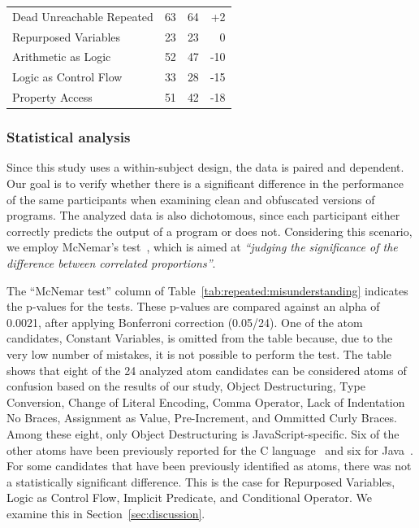 \begin{table}[t!]
{\begin{scriptsize}
\begin{tabular}{lrrr}
Dead Unreachable Repeated &           63 &      64 &                  +2 \\
Repurposed Variables      &           23 &      23 &                   0 \\
Arithmetic as Logic       &           52 &      47 &                 -10 \\
Logic as Control Flow     &           33 &      28 &                 -15 \\
Property Access           &           51 &      42 &                 -18 \\
\bottomrule  
\end{tabular}
\end{scriptsize}
}
\end{table}


\subsubsection*{Statistical analysis}

Since this study uses a within-subject design, the data is paired and dependent. Our goal is to verify whether there is a significant difference in the performance of the same participants when examining clean and obfuscated versions of programs. The analyzed data is also dichotomous, since each participant either correctly predicts the output of a program or does not. Considering this scenario, we employ McNemar's test~\cite{McNemar:1947:NSE}, which is aimed at \textit{``judging the significance of the difference between correlated proportions''}.

The ``McNemar test'' column of Table~\ref{tab:repeated:misunderstanding} indicates the p-values for the tests. These p-values are compared against an alpha of 0.0021, after applying Bonferroni correction (0.05/24). One of the atom candidates, Constant Variables, is omitted from the table because, due to the very low number of mistakes, it is not possible to perform the test. The table shows that eight of the 24 analyzed atom candidates can be considered atoms of confusion based on the results of our study, Object Destructuring, Type Conversion, Change of Literal Encoding, Comma Operator, Lack of Indentation No Braces, Assignment as Value, Pre-Increment, and Ommitted Curly Braces. Among these eight, only Object Destructuring is JavaScript-specific. Six of the other atoms have been previously reported for the C language~\cite{DBLP:conf/sigsoft/GopsteinIYDZYC17} and six for Java~\cite{Langhout:2021:ACJ}.
For some candidates that have been previously identified as atoms, there was not a statistically significant difference. This is the case for Repurposed Variables, Logic as Control Flow, Implicit Predicate, and Conditional Operator. We examine this in Section~\ref{sec:discussion}.

